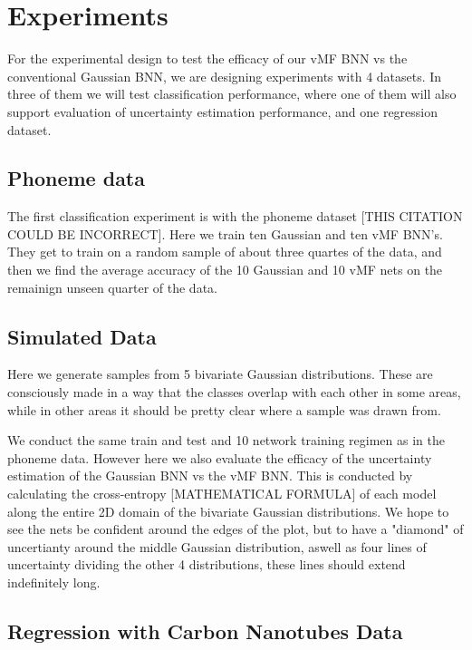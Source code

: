 \documentclass[nofootinbib,UKenglish,nobalancelastpage,12pt]{article}
\begin{document}
\section{Experiments}

For the experimental design to test the efficacy of our vMF BNN vs the conventional Gaussian BNN, we are designing experiments with 4 datasets. In three of them we will test classification performance, where one of them will also support evaluation of uncertainty estimation performance, and one regression dataset. 


\subsection{Phoneme data}
The first classification experiment is with the phoneme dataset \cite{phoneme_MAYBEWRONGLOOKINTOIT} [THIS CITATION COULD BE INCORRECT]. Here we train ten Gaussian and ten vMF BNN's. They get to train on a random sample of about three quartes of the data, and then we find the average accuracy of the 10 Gaussian and 10 vMF nets on the remainign unseen quarter of the data.

\subsection{Simulated Data}

Here we generate samples from 5 bivariate Gaussian distributions. These are consciously made in a way that the classes overlap with each other in some areas, while in other areas it should be pretty clear where a sample was drawn from. 

We conduct the same train and test and 10 network training regimen as in the phoneme data. However here we also evaluate the efficacy of the uncertainty estimation of the Gaussian BNN vs the vMF BNN. This is conducted by calculating the cross-entropy [MATHEMATICAL FORMULA] of each model along the entire 2D domain of the bivariate Gaussian distributions. We hope to see the nets be confident around the edges of the plot, but to have a "diamond" of uncertianty around the middle Gaussian distribution, aswell as four lines of uncertainty dividing the other 4 distributions, these lines should extend indefinitely long.

\subsection{Regression with Carbon Nanotubes Data}
\end{document}
